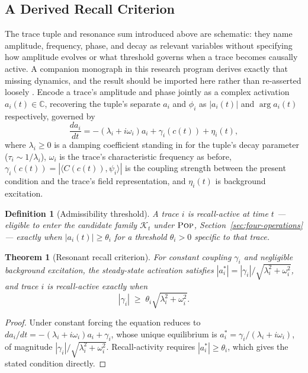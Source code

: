 \documentclass[11pt]{article}
\newcommand{\Pop}{\textsc{Pop}}
\newtheorem{definition}{Definition}
\newtheorem{theorem}{Theorem}
\begin{document}
\subsection{A Derived Recall Criterion}
\label{sec:recall-criterion}

The trace tuple and resonance sum introduced above are schematic: they name amplitude, frequency, phase, and decay as relevant variables without specifying how amplitude evolves or what threshold governs when a trace becomes causally active. A companion monograph in this research program derives exactly that missing dynamics, and the result should be imported here rather than re-asserted loosely \cite{flyxionMem8Monograph}. Encode a trace's amplitude and phase jointly as a complex activation $a_i(t)\in\mathbb{C}$, recovering the tuple's separate $a_i$ and $\phi_i$ as $|a_i(t)|$ and $\arg a_i(t)$ respectively, governed by
\[
\frac{da_i}{dt} = -(\lambda_i+i\omega_i)a_i + \gamma_i(c(t)) + \eta_i(t),
\]
where $\lambda_i\geq 0$ is a damping coefficient standing in for the tuple's decay parameter ($\tau_i\sim 1/\lambda_i$), $\omega_i$ is the trace's characteristic frequency as before, $\gamma_i(c(t))=|\langle C(c(t)),\psi_i\rangle|$ is the coupling strength between the present condition and the trace's field representation, and $\eta_i(t)$ is background excitation.

\begin{definition}[Admissibility threshold]
A trace $i$ is \emph{recall-active} at time $t$ --- eligible to enter the candidate family $\mathcal{K}_t$ under $\Pop$, Section~\ref{sec:four-operations} --- exactly when $|a_i(t)|\geq\theta_i$ for a threshold $\theta_i>0$ specific to that trace.
\end{definition}

\begin{theorem}[Resonant recall criterion]
\label{thm:recall}
For constant coupling $\gamma_i$ and negligible background excitation, the steady-state activation satisfies $|a_i^*|=|\gamma_i|/\sqrt{\lambda_i^2+\omega_i^2}$, and trace $i$ is recall-active exactly when
\[
|\gamma_i| \;\geq\; \theta_i\sqrt{\lambda_i^2+\omega_i^2}.
\]
\end{theorem}

\begin{proof}
Under constant forcing the equation reduces to $da_i/dt=-(\lambda_i+i\omega_i)a_i+\gamma_i$, whose unique equilibrium is $a_i^*=\gamma_i/(\lambda_i+i\omega_i)$, of magnitude $|\gamma_i|/\sqrt{\lambda_i^2+\omega_i^2}$. Recall-activity requires $|a_i^*|\geq\theta_i$, which gives the stated condition directly.
\end{proof}
\end{document}

